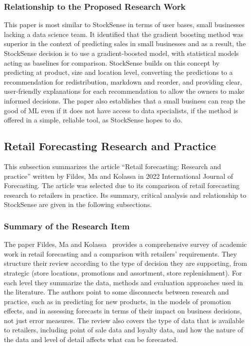 \documentclass{StockSense}
\begin{document}
\subsubsection{Relationship to the Proposed Research Work}

This paper is most similar to StockSense in terms of user bases, small businesses lacking a data science team. It identified that the gradient boosting method was superior in the context of predicting sales in small businesses and as a result, the StockSense decision is to use a gradient-boosted model, with statistical models acting as baselines for comparison. StockSense builds on this concept by predicting at product, size and location level, converting the predictions to a recommendation for redistribution, markdown and reorder, and providing clear, user-friendly explanations for each recommendation to allow the owners to make informed decisions. The paper also establishes that a small business can reap the good of ML even if it does not have access to data specialists, if the method is offered in a simple, reliable tool, as StockSense hopes to do.

\subsection{Retail Forecasting Research and Practice}

This subsection summarizes the article “Retail forecasting: Research and practice” written by Fildes, Ma and Kolassa in 2022 International Journal of Forecasting. The article was selected due to its comparison of retail forecasting research to retailers in practice. Its summary, critical analysis and relationship to StockSense are given in the following subsections.

\subsubsection{Summary of the Research Item}

The paper Fildes, Ma and Kolassa~\cite{fildes2022retail} provides a comprehensive survey of academic work in retail forecasting and a comparison with retailers' requirements. They structure their review according to the type of decision they are supporting, from strategic (store locations, promotions and assortment, store replenishment). For each level they summarize the data, methods and evaluation approaches used in the literature. The authors point to some disconnects between research and practice, such as in predicting for new products, in the models of promotion effects, and in assessing forecasts in terms of their impact on business decisions, not just error measures. The review also covers the type of data that is available to retailers, including point of sale data and loyalty data, and how the nature of the data and level of detail affects what can be forecasted.
\end{document}
